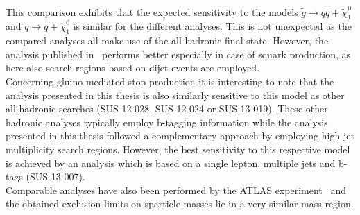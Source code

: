 \\
This comparison exhibits that the expected sensitivity to the models $\tilde{g} \rightarrow q\bar{q} + \tilde{\chi}_1^0$ and $\tilde{q} \rightarrow q + \tilde{\chi}_1^0$ is similar for the different analyses. This is not unexpected as the compared analyses all make use of the all-hadronic final state. However, the analysis published in~\cite{CMS-PAS-SUS-13-019} performs better especially in case of squark production, as here also search regions based on dijet events are employed. \\
Concerning gluino-mediated stop production it is interesting to note that the analysis presented in this thesis is also similarly sensitive to this model as other all-hadronic searches (\cf SUS-12-028, SUS-12-024 or SUS-13-019). These other hadronic analyses typically employ b-tagging information while the analysis presented in this thesis followed a complementary approach by employing high jet multiplicity search regions. However, the best sensitivity to this respective model is achieved by an analysis which is based on a single lepton, multiple jets and b-tags (SUS-13-007). 
\\
Comparable analyses have also been performed by the ATLAS experiment~\cite{Aad:2014wea, Aad:2013wta, Aad:2014lra} and the obtained exclusion limits on sparticle masses lie in a very similar mass region.

